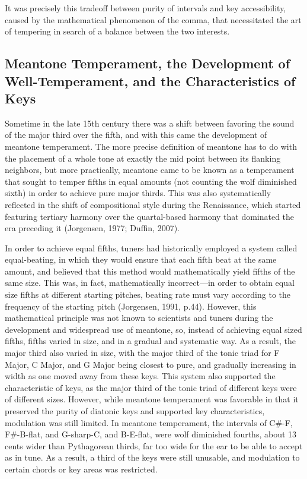 It was precisely this tradeoff between purity of intervals and key
accessibility, caused by the mathematical phenomenon of the comma, that
necessitated the art of tempering in search of a balance between the two
interests.

\subsection{Meantone Temperament, the Development of Well-Temperament,
and the Characteristics of
Keys}\label{meantone-temperament-the-development-of-well-temperament-and-the-characteristics-of-keys}

Sometime in the late 15th century there was a shift between favoring the
sound of the major third over the fifth, and with this came the
development of meantone temperament. The more precise definition of
meantone has to do with the placement of a whole tone at exactly the mid
point between its flanking neighbors, but more practically, meantone
came to be known as a temperament that sought to temper fifths in equal
amounts (not counting the wolf diminished sixth) in order to achieve
pure major thirds. This was also systematically reflected in the shift
of compositional style during the Renaissance, which started featuring
tertiary harmony over the quartal-based harmony that dominated the era
preceding it (Jorgensen, 1977; Duffin, 2007).

In order to achieve equal fifths, tuners had historically employed a
system called equal-beating, in which they would ensure that each fifth
beat at the same amount, and believed that this method would
mathematically yield fifths of the same size. This was, in fact,
mathematically incorrect---in order to obtain equal size fifths at
different starting pitches, beating rate must vary according to the
frequency of the starting pitch (Jorgensen, 1991, p.44). However, this
mathematical principle was not known to scientists and tuners during the
development and widespread use of meantone, so, instead of achieving
equal sized fifths, fifths varied in size, and in a gradual and
systematic way. As a result, the major third also varied in size, with
the major third of the tonic triad for F Major, C Major, and G Major
being closest to pure, and gradually increasing in width as one moved
away from these keys. This system also supported the characteristic of
keys, as the major third of the tonic triad of different keys were of
different sizes. However, while meantone temperament was favorable in
that it preserved the purity of diatonic keys and supported key
characteristics, modulation was still limited. In meantone temperament,
the intervals of C\#-F, F\#-B-flat, and G-sharp-C, and B-E-flat, were
wolf diminished fourths, about 13 cents wider than Pythagorean thirds,
far too wide for the ear to be able to accept as in tune. As a result, a
third of the keys were still unusable, and modulation to certain chords
or key areas was restricted.

